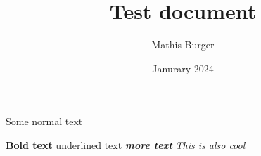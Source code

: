 \documentclass[12pt, letterpaper]{article}
\title{Test document}
\author{Mathis Burger}
\date{Janurary 2024}
\begin{document}
\maketitle

Some normal text

\textbf{Bold text}
\underline{underlined text}
\textbf{\textit{more text}}
\emph{This is also cool}
\end{document}
